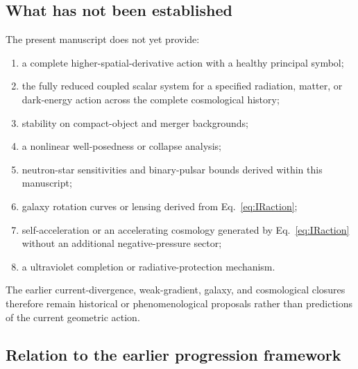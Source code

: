 \documentclass[11pt]{article}
\begin{document}
\subsection{What has not been established}

The present manuscript does not yet provide:
\begin{enumerate}[label=(\arabic*)]
\item a complete higher-spatial-derivative action with a healthy principal symbol;
\item the fully reduced coupled scalar system for a specified radiation, matter, or dark-energy action across the complete cosmological history;
\item stability on compact-object and merger backgrounds;
\item a nonlinear well-posedness or collapse analysis;
\item neutron-star sensitivities and binary-pulsar bounds derived within this manuscript;
\item galaxy rotation curves or lensing derived from Eq.~\eqref{eq:IRaction};
\item self-acceleration or an accelerating cosmology generated by Eq.~\eqref{eq:IRaction} without an additional negative-pressure sector;
\item a ultraviolet completion or radiative-protection mechanism.
\end{enumerate}
The earlier current-divergence, weak-gradient, galaxy, and cosmological closures therefore remain historical or phenomenological proposals rather than predictions of the current geometric action.

\subsection{Relation to the earlier progression framework}
\end{document}
